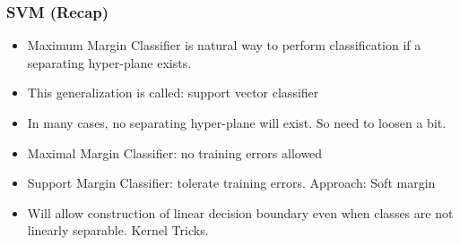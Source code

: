 %
%
%


%
%

%

\begin{frame}[fragile]\frametitle{SVM (Recap) }
\begin{itemize}
\item Maximum Margin Classifier is natural way to perform classification if a separating hyper-plane exists.
\item This generalization is called: support vector classifier
\item In many cases, no separating hyper-plane will exist. So need  to loosen a bit.
\item Maximal Margin Classifier: no training errors allowed
\item Support Margin Classifier: tolerate training errors. Approach: Soft margin
\item Will allow construction of linear decision boundary even when classes are not linearly separable. Kernel Tricks.
\end{itemize}

\end{frame}

